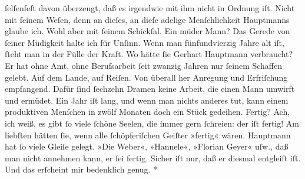 \begin{ledgroupsized}[t]{13cm}
{{                  felſenfeſt davon überzeugt, daß es irgendwie mit ihm nicht in Ordnung iſt. Nicht
                  mit ſeinem Weſen, denn an dieſes, an dieſe adelige Menſchlichkeit Hauptmanns glaube ich. Wohl aber mit ſeinem
                  Schickſal. Ein müder Mann? Das Gerede von ſeiner Müdigkeit halte ich für Unſinn.
                  Wenn man fünfundvierzig Jahre alt iſt, ſteht man in der Fülle der Kraft. Wo hätte
                  ſie Gerhart Hauptmann verbraucht? Er hat
                  ohne Amt, ohne Berufsarbeit ſeit zwanzig Jahren nur ſeinem Schaffen gelebt. Auf
                  dem Lande, auf Reiſen. Von überall her Anregung und Erfriſchung empfangend. Dafür
                  ſind ſechzehn Dramen keine Arbeit, die einen Mann umwirft und ermüdet. Ein Jahr
                  iſt lang, und wenn man nichts anderes tut, kann einem produktiven Menſchen in
                  zwölf Monaten doch ein Stück gedeihen. Fertig? Ach, ich weiß, es gibt ſo viele
                  ſchöne Seelen, die immer gern ſchreien: der iſt fertig! Am liebſten hätten ſie,
                  wenn alle ſchöpferiſchen Geiſter »fertig« wären. Hauptmann hat ſo viele Gleiſe gelegt. »Die Weber«, »Hannele«, »Florian Geyer« uſw., daß man nicht annehmen
                  kann, er ſei fertig. Sicher iſt nur, daß er diesmal entgleiſt iſt. Und das
                  erſcheint mir bedenklich genug.}}\pend
           \pstart
           \centering{}\textcolor{gray}{\textbf{*}}\pend

\end{ledgroupsized}
